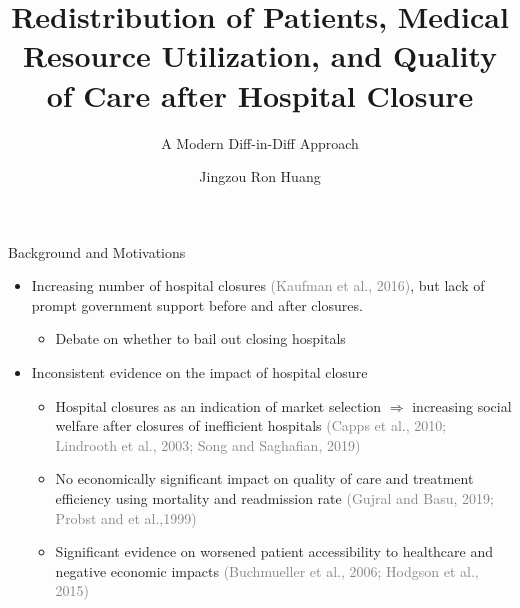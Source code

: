 \documentclass{beamer}
\title[Impact Evaluation of Hospital Closure]{Redistribution of Patients, Medical Resource Utilization, and Quality of Care after Hospital Closure}
\subtitle{A Modern Diff-in-Diff Approach}
\author[J. Huang]{
    Jingzou Ron Huang\inst{1}
}
\institute{
    \inst{1}Senior Undergraduate, Quantitative Sciences and Economics, Emory University
}
\theoremstyle{definition}
\begin{document}
\begin{frame}
\titlepage
\end{frame}



\begin{frame}{Background and Motivations}

\begin{itemize}
    \setlength{\itemsep}{18pt} %
    \item Increasing number of hospital closures \textcolor{gray}{(Kaufman et al., 2016)}, but lack of prompt government support before and after closures.
    \begin{itemize}
        \setlength{\itemsep}{10pt} 
        \item Debate on whether to bail out closing hospitals
    \end{itemize}
    \item Inconsistent evidence on the impact of hospital closure
    \begin{itemize}
        \setlength{\itemsep}{10pt}
        \item Hospital closures as an indication of market selection $\Rightarrow$ increasing social welfare after closures of inefficient hospitals \textcolor{gray}{(Capps et al., 2010; Lindrooth et al., 2003; Song and Saghafian, 2019)}
        \item No economically significant impact on quality of care and treatment efficiency using mortality and readmission rate   \textcolor{gray}{(Gujral and Basu, 2019; Probst and et al.,1999)}
        \item Significant evidence on worsened patient accessibility to healthcare and negative economic impacts \textcolor{gray}{(Buchmueller et al., 2006; Hodgson et al., 2015)}
    \end{itemize}
\end{itemize}

\end{frame}
\end{document}
